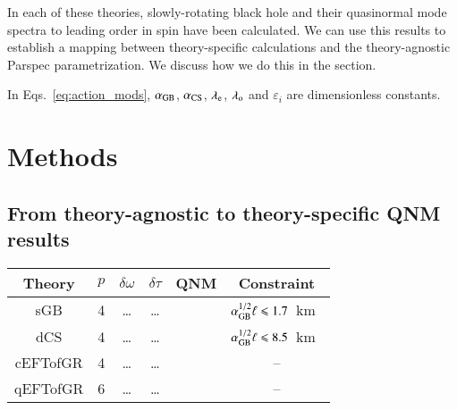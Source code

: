 \documentclass[twocolumn,prd,aps,superscriptaddress,preprintnumbers,tightenlines,showpacs,nofootinbib,eqsecnum,amsfonts,amsmath,longbibliography]{revtex4-2}
\newcommand{\lame}{\lambda_{\rm e}}
\newcommand{\lamo}{\lambda_{\rm o}}
\newcommand{\hs}[1]{{\textcolor{blue}{{[HS: #1]}} }}
\begin{document}
In each of these theories, slowly-rotating black hole and their quasinormal mode spectra
to leading order in spin have been calculated.
%
We can use this results to establish a mapping between theory-specific calculations and
the theory-agnostic {\sc Parspec} parametrization.
%
We discuss how we do this in the section.

In Eqs.~\eqref{eq:action_mods}, $\alpha_{\rm GB}$, $\alpha_{\rm CS}$, $\lame$,
$\lamo$ and $\varepsilon_{i}$ are dimensionless constants.


\section{Methods}
\label{sec:methods}

\subsection{From theory-agnostic to theory-specific QNM results}

\begin{table*}[th]
\begin{tabular}{c c c c c c}
\hline
\hline
Theory & $p$ & $\delta \omega$ & $\delta \tau$ & QNM & Constraint \\
\hline
sGB      & 4 & \dots & \dots & \cite{Pierini:2021jxd} & $\alpha^{1/2}_{\rm GB} \ell \leqslant 1.7$~km~\cite{Perkins:2021mhb} \\
dCS      & 4 & \dots & \dots & \cite{Wagle:2021tam} & $\alpha^{1/2}_{\rm GB} \ell \leqslant 8.5$~km~\cite{Silva:2020acr} \\
cEFTofGR & 4 & \dots & \dots & \cite{Cano:2021myl} & -- \\
qEFTofGR & 6 & \dots & \dots & \cite{Cano:2021myl} & -- \\
\hline
\hline
\end{tabular}
\caption{Summary of the quasinormal modes calculations.
%
We summarize each theory we have considered together with: the exponent $p$ at
which their QNM-modification enters, the corresponding modifications to the
oscillation frequency $\delta \omega$ and decay time $\delta \tau$, the
references from which we used the results from and the current best constraint
(if applicable).
%
\hs{Add a column with the constraint (if any) that we placed.}
\hs{TODO: add which runs are done and which need to be done.}
}
\label{tab:ref_theories_qnms}
\end{table*}
\end{document}
